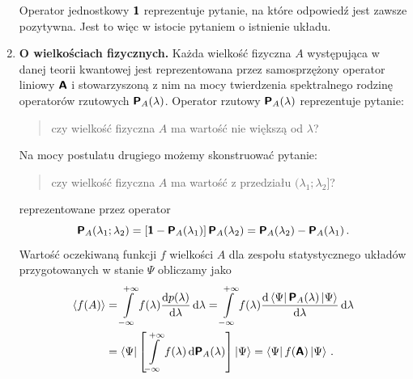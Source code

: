 \documentclass{myclass}
\begin{document}
\begin{enumerate}[label=\Roman*.]
    Operator jednostkowy \(\boldsymbol{\mathsf{1}}\) reprezentuje pytanie, na które odpowiedź jest zawsze
    pozytywna. Jest to więc w istocie pytaniem o istnienie układu.

    \item \textbf{O wielkościach fizycznych.} Każda wielkość fizyczna \(A\) występująca w danej
    teorii kwantowej jest reprezentowana przez samosprzężony operator liniowy \(\boldsymbol{\mathsf{A}}\) i
    stowarzyszoną z nim na mocy twierdzenia spektralnego rodzinę operatorów rzutowych
    \(\boldsymbol{\mathsf{P}}_A(\lambda)\). Operator rzutowy \(\boldsymbol{\mathsf{P}}_A(\lambda)\) reprezentuje pytanie:
    \begin{quote}
        czy wielkość fizyczna \(A\) ma wartość nie większą od \(\lambda\)?
    \end{quote}
    Na mocy postulatu drugiego możemy skonstruować pytanie:
    \begin{quote}
        czy wielkość fizyczna \(A\) ma wartość z przedziału \((\lambda_1;\lambda_2]\)?
    \end{quote}
    reprezentowane przez operator 
    \begin{equation*}
        \boldsymbol{\mathsf{P}}_A(\lambda_1;\lambda_2) = \left[\boldsymbol{\mathsf{1}} - \boldsymbol{\mathsf{P}}_A(\lambda_1)\right]\boldsymbol{\mathsf{P}}_A(\lambda_2) =
        \boldsymbol{\mathsf{P}}_A(\lambda_2)-\boldsymbol{\mathsf{P}}_A(\lambda_1)\,.
    \end{equation*}
    Wartość oczekiwaną funkcji \(f\) wielkości \(A\) dla zespołu statystycznego układów
    przygotowanych w stanie \(\Psi\) obliczamy jako
    \begin{equation*}
        \begin{split}
            \expval{f(A)} &= \int\limits_{-\infty}^{+\infty} f(\lambda) \dv{p(\lambda)}{\lambda} \dd{\lambda} = \int\limits_{-\infty}^{+\infty} f(\lambda) \dv{\bra{\Psi}\boldsymbol{\mathsf{P}}_A(\lambda)\ket{\Psi}}{\lambda} \dd{\lambda} \\
            &= \bra{\Psi}\left[\int\limits_{-\infty}^{+\infty} f(\lambda) \dd{\boldsymbol{\mathsf{P}}_A(\lambda)}\right]\ket{\Psi} = \bra{\Psi}f(\boldsymbol{\mathsf{A}})\ket{\Psi}\,.
        \end{split}
    \end{equation*}


\end{enumerate}
\end{document}
